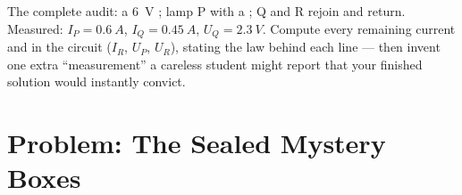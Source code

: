 \begin{exercise}[$\star\star\star$]\label{exo:g8:circuit-laws:12}
The complete audit: a \qty{6}{V} ; lamp P 
with a ;  Q and R rejoin and return.
Measured: $I_P = \qty{0.6}{A}$, $I_Q = \qty{0.45}{A}$,
$U_Q = \qty{2.3}{V}$. Compute every remaining current and
 in the circuit ($I_R$, $U_P$, $U_R$), stating the law
behind each line --- then invent one extra ``measurement'' a
careless student might report that your finished solution
would instantly convict.
\end{exercise}

\section{Problem: The Sealed Mystery Boxes}

